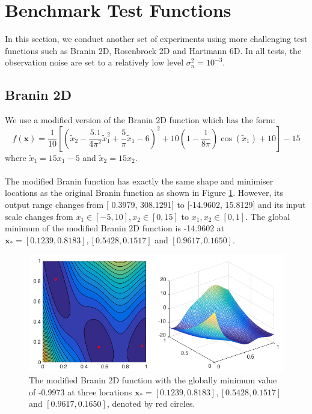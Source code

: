 \documentclass[a4paper,11pt]{report}
\begin{document}
\newpage
\section{Benchmark Test Functions}
In this section, we conduct another set of experiments using more challenging test functions such as Branin 2D, Rosenbrock 2D and Hartmann 6D. In all tests, the observation noise are set to a relatively low level $\sigma_n^2 = 10^{-3}$. 

\subsection{Branin 2D}
We use a modified version of the Branin 2D function which has the form: 
\begin{equation}
	f(\mathbf{x}) = \frac{1}{10} \left[ \left ( \tilde x_2 - \frac{5.1} {4 \pi^2} \tilde x_1^2+\frac{5}{\pi} \tilde x_1 - 6 \right)^2 +10 \left(1-\frac{1}{8\pi} \right) \cos( \tilde x_1)+10 \right ] -15
\end{equation}
where $\tilde x_1=15 x_1 -5$ and $\tilde x_2=15 x_2 $.
\\\\
The modified Branin function has exactly the same shape and minimiser locations as the original Branin function as shown in Figure \ref{2DBranin}. However, its output range changes from [ 0.3979, 308.1291] to [-14.9602, 15.8129] and its input scale changes from $ x_1 \in [-5,10] , x_2 \in [0, 15] $ to $ x_1,x_2 \in [0,1] $.  The global minimum of the modified Branin 2D function is  -14.9602 at $\mathbf{x}_{*} = [0.1239, 0.8183],  [0.5428, 0.1517]$ and $ [0.9617,0.1650]$. 
\\
\begin{figure} [H]
\label{2DBranin}
	\centering
	 \includegraphics[width=0.9\linewidth]{Branin2D.png}
\caption{ The modified Branin 2D function with the globally minimum value of -0.9973 at three locations $\mathbf{x}_{*} = [0.1239, 0.8183],  [0.5428, 0.1517]$ and $ [0.9617,0.1650]$, denoted by red circles.}
\end{figure}
\end{document}
